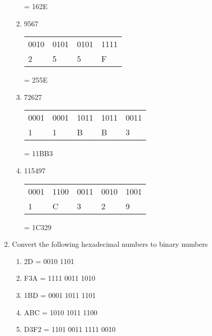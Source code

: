 \begin{enumerate}
\begin{enumerate}
\begin{table}[H]
        \end{table}
        = 162E
        \item 9567
        \begin{table}[H]
            \hspace*{4em}\begin{tabularx}{0.4\textwidth}{XXXX}
                0010 & 0101 & 0101 & 1111 \\
                2 & 5 & 5 & F
            \end{tabularx}
        \end{table}
        = 255E
        \item 72627
        \begin{table}[H]
            \hspace*{4em}\begin{tabularx}{0.4\textwidth}{XXXXX}
                0001 & 0001 & 1011 & 1011 & 0011 \\
                1 & 1 & B & B & 3
            \end{tabularx}
        \end{table}
        = 11BB3
        \item 115497
        \begin{table}[H]
            \hspace*{4em}\begin{tabularx}{0.4\textwidth}{XXXXX}
                0001 & 1100 & 0011 & 0010 & 1001 \\
                1 & C & 3 & 2 & 9
            \end{tabularx}
        \end{table}
        = 1C329
    \end{enumerate}
    \item Convert the following hexadecimal numbers to binary numbers
    \begin{enumerate}
        \item 2D = 0010 1101
        \item F3A = 1111 0011 1010
        \item 1BD = 0001 1011 1101
        \item ABC = 1010 1011 1100
        \item D3F2 = 1101 0011 1111 0010
    \end{enumerate}
\end{enumerate}

